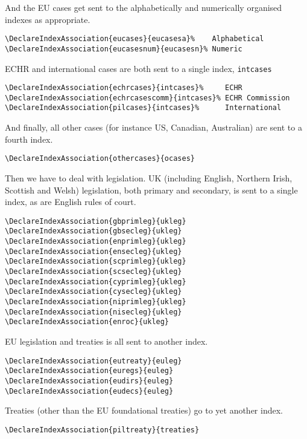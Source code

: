 \documentclass[a5paper,fontsize=9pt,DIV=1]{scrartcl}
\begin{document}
And the EU cases get sent to the alphabetically and numerically organised indexes as appropriate.
\begin{verbatim}
\DeclareIndexAssociation{eucases}{eucasesa}%    Alphabetical
\DeclareIndexAssociation{eucasesnum}{eucasesn}% Numeric
\end{verbatim}

ECHR and international cases are both sent to a single index, \texttt{intcases}
\begin{verbatim}
\DeclareIndexAssociation{echrcases}{intcases}%     ECHR
\DeclareIndexAssociation{echrcasescomm}{intcases}% ECHR Commission
\DeclareIndexAssociation{pilcases}{intcases}%      International
\end{verbatim}

And finally, all other cases (for instance US, Canadian, Australian) are sent to a fourth index.

\begin{verbatim}
\DeclareIndexAssociation{othercases}{ocases}
\end{verbatim}

Then we have to deal with legislation. UK (including English, Northern Irish, Scottish and Welsh) legislation, both primary and secondary, is sent to a single index, as are English rules of court.
\begin{verbatim}
\DeclareIndexAssociation{gbprimleg}{ukleg}
\DeclareIndexAssociation{gbsecleg}{ukleg}
\DeclareIndexAssociation{enprimleg}{ukleg}
\DeclareIndexAssociation{ensecleg}{ukleg}
\DeclareIndexAssociation{scprimleg}{ukleg}
\DeclareIndexAssociation{scsecleg}{ukleg}
\DeclareIndexAssociation{cyprimleg}{ukleg}
\DeclareIndexAssociation{cysecleg}{ukleg}
\DeclareIndexAssociation{niprimleg}{ukleg}
\DeclareIndexAssociation{nisecleg}{ukleg}
\DeclareIndexAssociation{enroc}{ukleg}
\end{verbatim}

EU legislation and treaties is all sent to another index.
\begin{verbatim}
\DeclareIndexAssociation{eutreaty}{euleg}
\DeclareIndexAssociation{euregs}{euleg}
\DeclareIndexAssociation{eudirs}{euleg}
\DeclareIndexAssociation{eudecs}{euleg}
\end{verbatim}

Treaties (other than the EU foundational treaties) go to yet another index.

\begin{verbatim}
\DeclareIndexAssociation{piltreaty}{treaties}
\end{verbatim}
\end{document}
